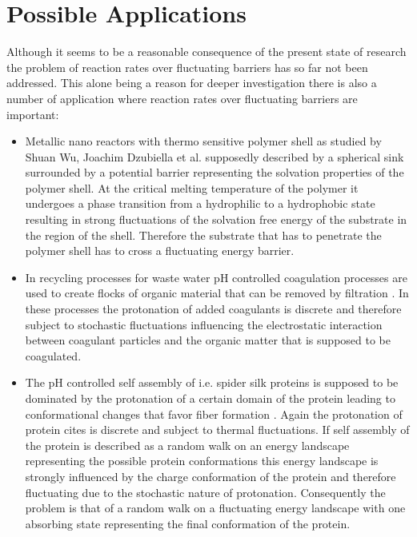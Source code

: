 \section{Possible Applications}
Although it seems to be a reasonable consequence of the present state of research the problem of reaction rates over fluctuating barriers has so far not been addressed. This alone being a reason for deeper investigation there is also a number of application where reaction rates over fluctuating barriers are important:
\begin{itemize}
    \item Metallic nano reactors with thermo sensitive polymer shell as studied by Shuan Wu, Joachim Dzubiella et al. \cite{Wu2012a} supposedly described by a spherical sink surrounded by a potential barrier representing the solvation properties of the polymer shell. At the critical melting temperature of the polymer it undergoes a phase transition from a hydrophilic to a hydrophobic state resulting in strong fluctuations of the solvation free energy of the substrate in the region of the shell. Therefore the substrate that has to penetrate the polymer shell has to cross a fluctuating energy barrier.
    \item In recycling processes for waste water pH controlled coagulation processes are used to create flocks of organic material that can be removed by filtration \cite{Gregor1997}. In these processes the protonation of added coagulants is discrete and therefore subject to stochastic fluctuations influencing the electrostatic interaction between coagulant particles and the organic matter that is supposed to be coagulated. 
    \item The pH controlled self assembly of i.e. spider silk proteins \cite{Askarieh2010} is supposed to be dominated by the protonation of a certain domain of the protein leading to conformational changes that favor fiber formation \cite{Gaines2010}. Again the protonation of protein cites is discrete and subject to thermal fluctuations. If self assembly of the protein is described as a random walk on an energy landscape representing the possible protein conformations \cite{Rathore2002} this energy landscape is strongly influenced by the charge conformation of the protein and therefore fluctuating due to the stochastic nature of protonation. Consequently the problem is that of a random walk on a fluctuating energy landscape with one absorbing state representing the final conformation of the protein.
\end{itemize}


